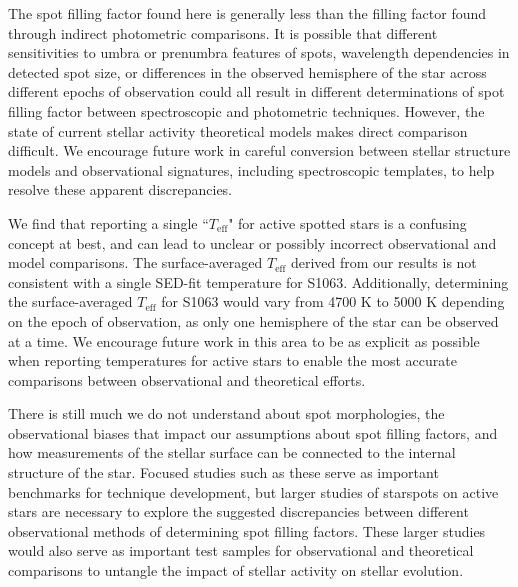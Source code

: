 \documentclass[trackchanges]{aastex631}
\begin{document}
The spot filling factor found here is generally less than the filling factor found through indirect photometric comparisons. It is possible that different sensitivities to umbra or prenumbra features of spots, wavelength dependencies in detected spot size, or differences in the observed hemisphere of the star across different epochs of observation could all result in different determinations of spot filling factor between spectroscopic and photometric techniques. However, the state of current stellar activity theoretical models makes direct comparison difficult. We encourage future work in careful conversion between stellar structure models and observational signatures, including spectroscopic templates, to help resolve these apparent discrepancies. %

We find that reporting a single ``$T_{\mathrm{eff}}$" for active spotted stars is a confusing concept at best, and can lead to unclear or possibly incorrect observational and model comparisons. The surface-averaged $T_{\mathrm{eff}}$ derived from our results is not consistent with a single SED-fit temperature for S1063. Additionally, determining the surface-averaged $T_{\mathrm{eff}}$ for S1063 would vary from 4700 K to 5000 K depending on the epoch of observation, as only one hemisphere of the star can be observed at a time. We encourage future work in this area to be as explicit as possible when reporting temperatures for active stars to enable the most accurate comparisons between observational and theoretical efforts.

There is still much we do not understand about spot morphologies, the observational biases that impact our assumptions about spot filling factors, and how measurements of the stellar surface can be connected to the internal structure of the star. Focused studies such as these serve as important benchmarks for technique development, but larger studies of starspots on active stars are necessary to explore the suggested discrepancies between different observational methods of determining spot filling factors. These larger studies would also serve as important test samples for observational and theoretical comparisons to untangle the impact of stellar activity on stellar evolution.
\end{document}
